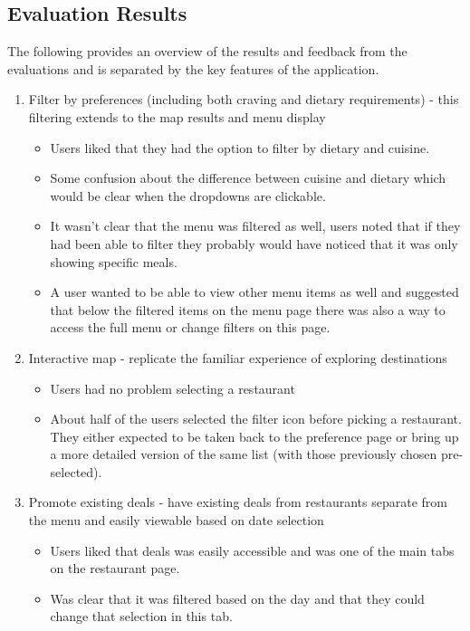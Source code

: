 \documentclass[a4 paper, 12pt]{article}
\begin{document}
\subsection{Evaluation Results}
The following provides an overview of the results and feedback from the evaluations and is separated by the key features of the application.

\begin{enumerate}
    \item Filter by preferences (including both craving and dietary requirements) - this filtering extends to the map results and menu display
        \begin{itemize}
            \item Users liked that they had the option to filter by dietary and cuisine. 
            \item Some confusion about the difference between cuisine and dietary which would be clear when the dropdowns are clickable.
            \item It wasn't clear that the menu was filtered as well, users noted that if they had been able to filter they probably would have noticed that it was only showing specific meals.
            \item A user wanted to be able to view other menu items as well and suggested that below the filtered items on the menu page there was also a way to access the full menu or change filters on this page. 
        \end{itemize}

    \item Interactive map - replicate the familiar experience of exploring destinations
        \begin{itemize}
            \item Users had no problem selecting a restaurant
            \item About half of the users selected the filter icon before picking a restaurant. They either expected to be taken back to the preference page or bring up a more detailed version of the same list (with those previously chosen pre-selected). 
        \end{itemize}

    \item Promote existing deals - have existing deals from restaurants separate from the menu and easily viewable based on date selection
        \begin{itemize}
            \item Users liked that deals was easily accessible and was one of the main tabs on the restaurant page. 
            \item Was clear that it was filtered based on the day and that they could change that selection in this tab.
        \end{itemize}


\end{enumerate}
\end{document}
